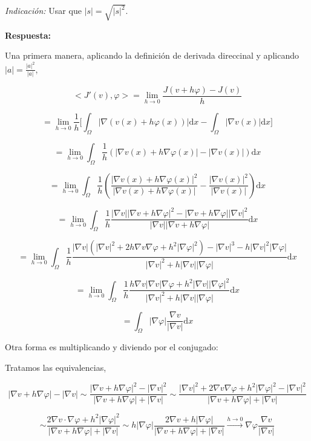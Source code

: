 \documentclass{article}
\begin{document}
\emph{Indicación:} Usar que $|s| = \sqrt{|s|^2}$.

    \textbf{Respuesta:}

    Una primera manera, aplicando la definición de derivada direccinal y
aplicando $|a| = \frac{|a|^2}{|a|}$,

\[
< J'(v), \varphi > = \lim\limits_{h\rightarrow 0} \frac{J(v+h\varphi) - J(v)}{h} 
\]

\[
= \lim\limits_{h\rightarrow 0} \frac{1}{h} \Big[\int_{\Omega} |\nabla(v(x) + h\varphi(x))|\text{d}x - \int_{\Omega} |\nabla v(x)|\text{d}x \Big] 
\]

\[
= \lim\limits_{h\rightarrow 0} \int_{\Omega}\frac{1}{h} (|\nabla v(x) + h\nabla \varphi(x)| - |\nabla v(x)|) \text{d}x
\]

\[
= \lim\limits_{h\rightarrow 0} \int_{\Omega}\frac{1}{h} (\frac{|\nabla v(x) + h\nabla \varphi(x)|^2}{|\nabla v(x) + h\nabla \varphi(x)|} - \frac{|\nabla v(x)|^2}{|\nabla v(x)|} ) \text{d}x
\]

\[
= \lim\limits_{h\rightarrow 0} \int_{\Omega}\frac{1}{h} \frac{|\nabla v| |\nabla v + h\nabla\varphi|^2 - |\nabla v + h \nabla \varphi| |\nabla v|^2}{|\nabla v| |\nabla v + h \nabla \varphi|} \text{d}x 
\]

\[
= \lim\limits_{h\rightarrow 0} \int_{\Omega}\frac{1}{h} \frac{|\nabla v| (|\nabla v|^2 + 2h\nabla v\nabla \varphi + h^2 |\nabla \varphi|^2) - |\nabla v|^3 - h |\nabla v|^2|\nabla \varphi|}{|\nabla v|^2 + h |\nabla v| |\nabla \varphi|} \text{d}x \]

\[
= \lim\limits_{h\rightarrow 0} \int_{\Omega}\frac{1}{h} \frac{h \nabla v |\nabla v| \nabla \varphi + h^2 |\nabla v| |\nabla \varphi|^2}{|\nabla v|^2 + h |\nabla v| |\nabla \varphi|} \text{d}x
\]

\[
= \int_{\Omega} |\nabla \varphi| \frac{\nabla v}{|\nabla v|}\text{d}x
\]

    Otra forma es multiplicando y diviendo por el conjugado:

    Tratamos las equivalencias,

\[
|\nabla v + h\nabla \varphi| - |\nabla v| \sim \frac{|\nabla v + h\nabla \varphi|^2 - |\nabla v|^2 }{|\nabla v + h\nabla \varphi| + |\nabla v|}
\sim \frac{|\nabla v|^2 + 2 \nabla v \nabla \varphi + h^2|\nabla \varphi|^2 - |\nabla v|^2}{|\nabla v + h\nabla \varphi| + |\nabla v|} 
\]

\[
\sim \frac{2 \nabla v \cdot \nabla \varphi + h^2 |\nabla \varphi|^2 }{|\nabla v + h\nabla \varphi| + |\nabla v|} 
\sim h |\nabla \varphi| \frac{2\nabla v + h|\nabla \varphi|}{|\nabla v + h\nabla \varphi| + |\nabla v|} \xrightarrow{h\rightarrow 0} \nabla \varphi \frac{\nabla v}{|\nabla v|}
\]
\end{document}
